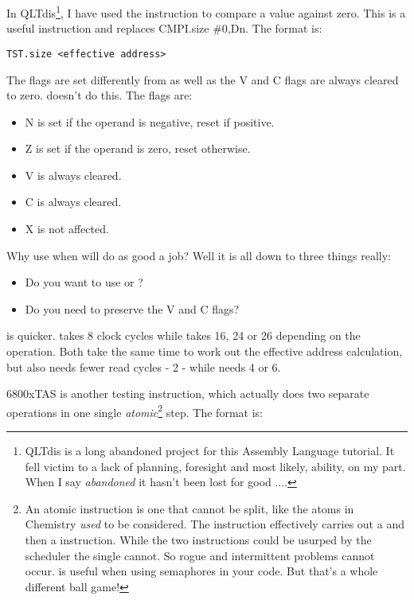 In QLTdis\footnote{QLTdis is a long abandoned project for this Assembly Language tutorial. It fell victim to a lack of planning, foresight and most likely, ability, on my part. When I say \emph{abandoned} it hasn't been lost for good ....}, I have used the  instruction to compare a value
      against zero. This is a useful instruction and replaces CMPI.size \#0,Dn.
      The format is:

\begin{lstlisting}[firstnumber=1,]
        TST.size <effective address>
\end{lstlisting}

The flags are set differently from  as well as the V and C
      flags are always cleared to zero.  doesn't do this. The flags are:
\begin{itemize}[itemsep=0pt]

\item{}N is set if the operand is negative, reset if positive.


\item{}Z is set if the operand is zero, reset otherwise.


\item{}V is always cleared.


\item{}C is always cleared.


\item{}X is not affected.

\end{itemize}

Why use  when  will do as good a job? Well it is all down
      to three things really:
\begin{itemize}[itemsep=0pt]

\item{}Do you want to use  or ?


\item{}Do you need to preserve the V and C flags?

\end{itemize}

 is quicker.  takes 8 clock cycles while  takes 16, 24
      or 26 depending on the operation. Both take the same time to work out the
      effective address calculation, but  also needs fewer read cycles -{} 2
      -{} while  needs 4 or 6.

\mc6800x{TAS}
 is another testing instruction, which actually does two
      separate operations in one single \emph{atomic}\footnote{An atomic instruction is one that cannot be split, like the atoms in Chemistry \emph{used} to be considered. The  instruction effectively carries out a  and then a  instruction. While the two instructions could be usurped by the scheduler the single  cannot. So rogue and intermittent problems cannot occur.  is useful when using semaphores in your code. But that's a whole different ball game!} step. The format is:

